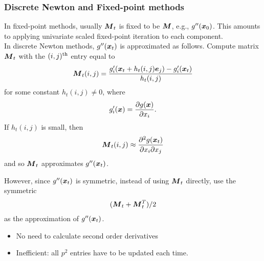 


\begin{frame}
  \frametitle{Discrete Newton and Fixed-point methods}
  In fixed-point methods, usually $\boldsymbol{M}_t$ is fixed to be
  $\boldsymbol{M}$, e.g., $g''(\boldsymbol{x}_0)$. This amounts to applying univariate scaled fixed-point iteration to each component. \\

  In discrete Newton methods, $g''(\boldsymbol{x}_t)$ is approximated as follows.
  Compute matrix $\boldsymbol{M}_t$ with the $(i,j)\sp\text{th}$ entry equal to
  \begin{align*}
    \boldsymbol{M}_t(i,j) = \frac{g_i'(\boldsymbol{x}_t + h_t(i,j) \boldsymbol{e}_j) -
      g_i'(\boldsymbol{x}_t)}{h_t(i,j)}
  \end{align*}
  for some constant $h_t(i,j)\not=0$, where
  \begin{align*}
    g_i'(\boldsymbol{x}) = \frac{\partial g(\boldsymbol{x})}{\partial x_i}.
  \end{align*}
  If $h_t(i,j)$ is small, then
  \begin{align*}
    \boldsymbol{M}_t(i,j)\approx \frac{\partial^2 g(\boldsymbol{x}_t)}{\partial
      x_i \partial x_j}
  \end{align*}
  and so $\boldsymbol{M}_t$ approximates $g''(\boldsymbol{x}_t)$.

  \end{frame}

  \begin{frame}
  However, since  $g''(\boldsymbol{x}_t)$ is symmetric, instead of using $\boldsymbol{M}_t$ directly, use the symmetric
  \begin{align*}
    (\boldsymbol{M}_t + \boldsymbol{M}_t\sp{T})/2
  \end{align*}
  as the approximation of $g''(\boldsymbol{x}_t)$.
  \begin{itemize}
  \item No need to calculate second order derivatives
  \item Inefficient: all $p^2$ entries have to be updated each time.
  \end{itemize}

  \end{frame}

